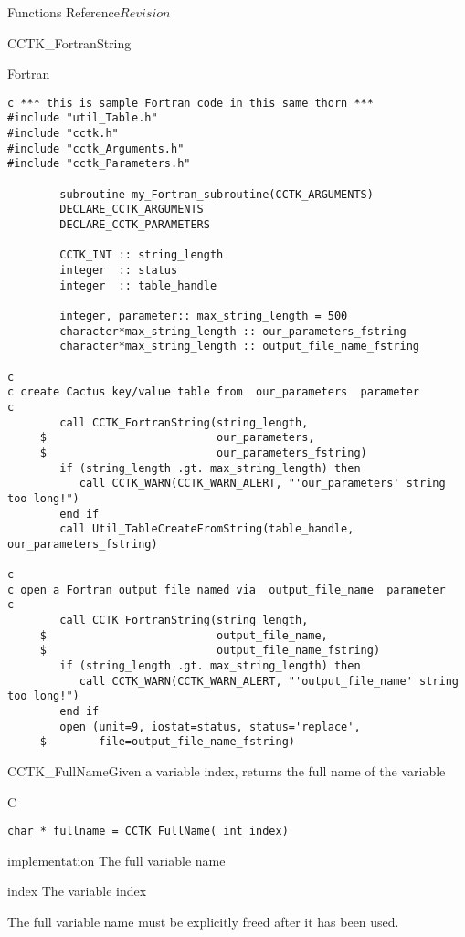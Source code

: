 \begin{cactuspart}{ Functions Reference}{}{$Revision$}
\begin{FunctionDescription}{CCTK\_FortranString}
\begin{ExampleSection}
\begin{Example}{Fortran}
\begin{verbatim}
c *** this is sample Fortran code in this same thorn ***
#include "util_Table.h"
#include "cctk.h"
#include "cctk_Arguments.h"
#include "cctk_Parameters.h"

        subroutine my_Fortran_subroutine(CCTK_ARGUMENTS)
        DECLARE_CCTK_ARGUMENTS
        DECLARE_CCTK_PARAMETERS

        CCTK_INT :: string_length
        integer  :: status
        integer  :: table_handle

        integer, parameter:: max_string_length = 500
        character*max_string_length :: our_parameters_fstring
        character*max_string_length :: output_file_name_fstring

c
c create Cactus key/value table from  our_parameters  parameter
c
        call CCTK_FortranString(string_length,
     $                          our_parameters,
     $                          our_parameters_fstring)
        if (string_length .gt. max_string_length) then
           call CCTK_WARN(CCTK_WARN_ALERT, "'our_parameters' string too long!")
        end if
        call Util_TableCreateFromString(table_handle, our_parameters_fstring)

c
c open a Fortran output file named via  output_file_name  parameter
c
        call CCTK_FortranString(string_length,
     $                          output_file_name,
     $                          output_file_name_fstring)
        if (string_length .gt. max_string_length) then
           call CCTK_WARN(CCTK_WARN_ALERT, "'output_file_name' string too long!")
        end if
        open (unit=9, iostat=status, status='replace',
     $        file=output_file_name_fstring)
\end{verbatim}
\end{Example}
\end{ExampleSection}
\end{FunctionDescription}



\begin{FunctionDescription}{CCTK\_FullName}{Given a variable index, returns the full name of the variable}
\label{CCTK-FullName}
\begin{SynopsisSection}
\begin{Synopsis}{C}
\begin{verbatim}char * fullname = CCTK_FullName( int index)\end{verbatim}
\end{Synopsis}
\end{SynopsisSection}
\begin{ParameterSection}
\begin{Parameter}{implementation}
The full variable name
\end{Parameter}
\begin{Parameter}{index}
The variable index
\end{Parameter}
\end{ParameterSection}
\begin{Discussion}
The full variable name must be explicitly freed after it has been used.


\end{Discussion}
\end{FunctionDescription}
\end{cactuspart}
